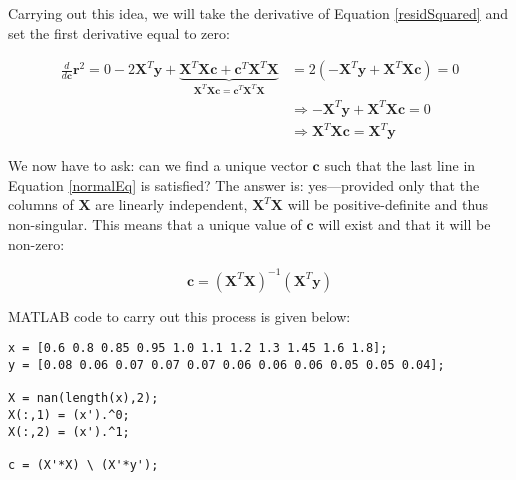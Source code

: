 Carrying out this idea, we will take the derivative of Equation
\ref{residSquared} and set the first derivative equal to zero:

\begin{equation}
\begin{split}
\frac{d}{d\mathbf{c}}\mathbf{r}^{2} = 0  - 2\mathbf{X}^{T}\mathbf{y} + \underbrace{\mathbf{X}^{T}\mathbf{X}\mathbf{c} + \mathbf{c}^{T}\mathbf{X}^{T}\mathbf{X}}_{\mathbf{X}^{T}\mathbf{X}\mathbf{c} = \mathbf{c}^{T}\mathbf{X}^{T}\mathbf{X}} &= 2\left(-\mathbf{X}^{T}\mathbf{y}+
\mathbf{X}^{T}\mathbf{X} \mathbf{c}\right) = 0 \\
&\Rightarrow -\mathbf{X}^{T}\mathbf{y} + \mathbf{X}^{T}\mathbf{X}\mathbf{c} =
0 \\
&\Rightarrow \mathbf{X}^{T}\mathbf{X} \mathbf{c} = \mathbf{X}^{T}\mathbf{y}
\end{split}
\label{normalEq}
\end{equation}

We now have to ask: can we find a unique vector $\mathbf{c}$ such that the
last line in Equation \ref{normalEq} is satisfied?  The answer is:
yes---provided only that the columns of $\mathbf{X}$ are linearly
independent, $\mathbf{X}^{T}\mathbf{X}$ will be positive-definite and thus non-singular.  This means that a unique value of $\mathbf{c}$
will exist and that it will be non-zero:

\begin{equation}
\mathbf{c} = \left(\mathbf{X}^{T}\mathbf{X}\right)^{-1}
\left(\mathbf{X}^{T}\mathbf{y}\right)
\label{lstSqSol}
\end{equation} 


MATLAB code to carry out this process is given below:

\begin{lstlisting}[style=myMatlab]
x = [0.6 0.8 0.85 0.95 1.0 1.1 1.2 1.3 1.45 1.6 1.8]; 
y = [0.08 0.06 0.07 0.07 0.07 0.06 0.06 0.06 0.05 0.05 0.04]; 

X = nan(length(x),2);
X(:,1) = (x').^0;
X(:,2) = (x').^1;

c = (X'*X) \ (X'*y');
\end{lstlisting}
